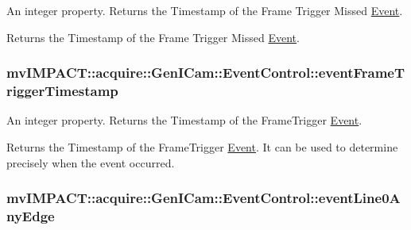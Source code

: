 An integer property. Returns the Timestamp of the Frame Trigger Missed \hyperlink{classmv_i_m_p_a_c_t_1_1acquire_1_1_event}{Event}. 

Returns the Timestamp of the Frame Trigger Missed \hyperlink{classmv_i_m_p_a_c_t_1_1acquire_1_1_event}{Event}. \hypertarget{classmv_i_m_p_a_c_t_1_1acquire_1_1_gen_i_cam_1_1_event_control_a48c1c46036aa4acd0c45ecc45da45c46}{
\subsubsection[{event\+Frame\+Trigger\+Timestamp}]{ mv\+I\+M\+P\+A\+C\+T\+::acquire\+::\+Gen\+I\+Cam\+::\+Event\+Control\+::event\+Frame\+Trigger\+Timestamp}}\label{classmv_i_m_p_a_c_t_1_1acquire_1_1_gen_i_cam_1_1_event_control_a48c1c46036aa4acd0c45ecc45da45c46}


An integer property. Returns the Timestamp of the Frame\+Trigger \hyperlink{classmv_i_m_p_a_c_t_1_1acquire_1_1_event}{Event}. 

Returns the Timestamp of the Frame\+Trigger \hyperlink{classmv_i_m_p_a_c_t_1_1acquire_1_1_event}{Event}. It can be used to determine precisely when the event occurred. \hypertarget{classmv_i_m_p_a_c_t_1_1acquire_1_1_gen_i_cam_1_1_event_control_af8dd1cea2f256d419321e1fcca94507d}{
\subsubsection[{event\+Line0\+Any\+Edge}]{ mv\+I\+M\+P\+A\+C\+T\+::acquire\+::\+Gen\+I\+Cam\+::\+Event\+Control\+::event\+Line0\+Any\+Edge}}\label{classmv_i_m_p_a_c_t_1_1acquire_1_1_gen_i_cam_1_1_event_control_af8dd1cea2f256d419321e1fcca94507d}


